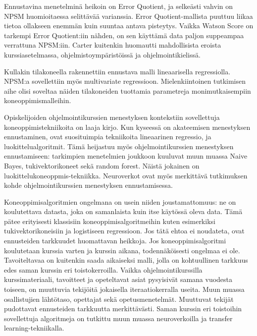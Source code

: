 \documentclass[finnish,twoside,openright]{HYgraduMLDS}
\begin{document}
Ennustavina menetelminä heikoin on Error Quotient, ja selkeästi vahvin on NPSM huomioitaessa selittävää varianssia\cite{carter2015normalized}. Error Quotient-mallista puuttuu liikaa tietoa ollakseen enemmän kuin suuntaa antava pisteytys\cite{jadud2006methods}. Vaikka Watson Score on tarkempi Error Quotient:iin nähden, on sen käyttämä data paljon suppeampaa verrattuna NPSM:iin\cite{carter2015normalized}. Carter kuitenkin huomautti mahdollisista eroista kurssiasetelmassa, ohjelmistoympäristöissä ja ohjelmointikielissä\cite{carter2015normalized}. 

Kullakin tilakoneella rakennettiin ennustava malli lineaarisella regressiolla. NPSM:a sovellettiin myös multivariate regressioon. Mielenkiintoinen tutkimisen aihe olisi soveltaa näiden tilakoneiden tuottamia parametreja monimutkaisempiin koneoppimismalleihin.

Opiskelijoiden ohjelmointikurssien menestyksen kontekstiin sovellettuja koneoppimistekniikoita on laaja kirjo. Kun kyseessä on akateemisen menestyksen ennustaminen, ovat suosituimpia tekniikoita lineaarinen regressio, ja luokittelualgoritmit\cite{hellas2018predicting}. Tämä heijastuu myös ohjelmointikurssien menestyksen ennustamiseen: tarkimpien menetelmien joukkoon kuuluvat muun muassa Naive Bayes\cite{bergin2015using}, tukivektorikoneet\cite{bergin2015using} sekä random forest\cite{lagus2018transfer}. Näistä jokainen on luokittelukoneoppmis-tekniikka. Neuroverkot ovat myös merkittävä tutkimuksen kohde ohjelmointikurssien menestyksen ennustamisessa\cite{Castro-Wunsch:2017:ENN:3017680.3017792}. 

Koneoppimisalgoritmien ongelmana on usein niiden joustamattomuus: ne on koulutettava datasta, joka on samanlaista kuin itse käytössä oleva data. Tämä pätee erityisesti klassisiin koneoppimisalgoritmeihin kuten esimerkiksi tukivektorikoneisiin ja logistiseen regressioon. Jos tätä ehtoa ei noudateta, ovat ennusteiden tarkkuudet huomattavan heikkoja. Jos koneoppimisalgoritmi koulutetaan kurssia varten ja kurssin aikana, todennäköisesti ongelmaa ei ole. Tavoiteltavaa on kuitenkin saada aikaiseksi malli, jolla on kohtuullinen tarkkuus edes saman kurssin eri toistokerroilla. Vaikka ohjelmointikurssilla kurssimateriaali, tavoitteet ja opeteltavat asiat pysyisivät samana vuodesta toiseen, on muuttuvia tekijöitä jokaisella iteraatiokerralla useita. Muun muassa osallistujien lähtötaso, opettajat sekä opetusmenetelmät. Muuttuvat tekijät pudottavat ennusteiden tarkkuutta merkittävästi. Saman kurssin eri toistoihin sovellettuja algoritmeja on tutkittu muun muassa neuroverkoilla\cite{Castro-Wunsch:2017:ENN:3017680.3017792} ja transfer learning\cite{lagus2018transfer}-tekniikalla.
\end{document}
